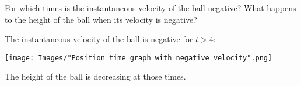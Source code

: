 \documentclass[nooutcomes]{ximera}
\renewenvironment{freeResponse}{
\ifhandout\setbox0\vbox\bgroup\else
\begin{trivlist}\item[\hskip \labelsep\bfseries Solution:\hspace{2ex}]
\fi}
{\ifhandout\egroup\else
\end{trivlist}
\fi}
\begin{document}
\begin{problem}
\begin{itemize}
     \item[(h)]
      For which times is the instantaneous velocity of the ball negative?
      What happens to the height of the ball when its velocity is negative?
      \begin{freeResponse}
        The instantaneous velocity of the ball is negative for $t > 4$:
        \begin{image}
          \texttt{[image: Images/"Position time graph with negative velocity".png]}
        \end{image}
        The height of the ball is decreasing at those times.
      \end{freeResponse}

  \end{itemize}
\end{problem}
\end{document}
